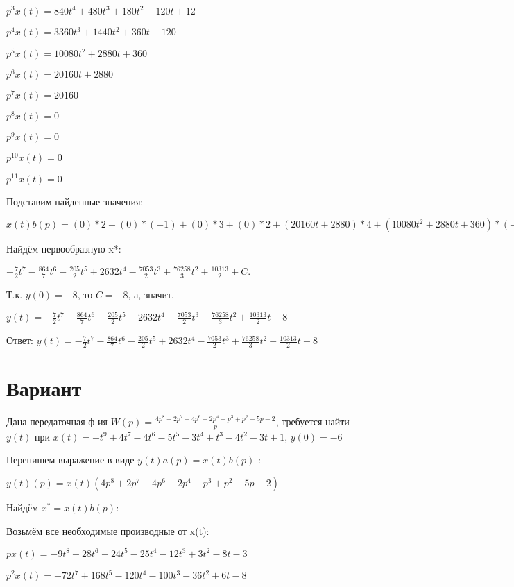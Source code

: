 \documentclass{article}
\begin{document}
{{{$p^3x(t)=840t^{4}+480t^{3}+180t^{2}-120t+12$

$p^4x(t)=3360t^{3}+1440t^{2}+360t-120$

$p^5x(t)=10080t^{2}+2880t+360$

$p^6x(t)=20160t+2880$

$p^7x(t)=20160$

$p^8x(t)=0$

$p^9x(t)=0$

$p^10x(t)=0$

$p^11x(t)=0$

Подставим найденные значения:

$x(t)b(p) = (0)*2+(0)*(-1)+(0)*3+(0)*2+(20160t+2880)*4+(10080t^{2}+2880t+360)*(-2)+(3360t^{3}+1440t^{2}+360t-120)*4+(168t^{5}+120t^{4}+60t^{3}-60t^{2}+12t+2)*(-5)+(28t^{6}+24t^{5}+15t^{4}-20t^{3}+6t^{2}+2t-3)*(-1)+=-28t^{6}-864t^{5}-615t^{4}+13160t^{3}-14106t^{2}+76258t$





Найдём первообразную x*:

$-\frac{7}{2}t^{7}-\frac{864}{7}t^{6}-\frac{205}{2}t^{5}+2632t^{4}-\frac{7053}{2}t^{3}+\frac{76258}{3}t^{2}+\frac{10313}{2}+C.$

Т.к. $y(0)=-8$, то $C=-8$, а, значит, 

$y(t)=-\frac{7}{2}t^{7}-\frac{864}{7}t^{6}-\frac{205}{2}t^{5}+2632t^{4}-\frac{7053}{2}t^{3}+\frac{76258}{3}t^{2}+\frac{10313}{2}t-8$

Ответ: $y(t) = -\frac{7}{2}t^{7}-\frac{864}{7}t^{6}-\frac{205}{2}t^{5}+2632t^{4}-\frac{7053}{2}t^{3}+\frac{76258}{3}t^{2}+\frac{10313}{2}t-8$

\section{Вариант}

Дана передаточная ф-ия $W(p)=\frac{4p^{8}+2p^{7}-4p^{6}-2p^{4}-p^{3}+p^{2}-5p-2}{p}$, требуется найти $y(t)$ при $x(t)=-t^{9}+4t^{7}-4t^{6}-5t^{5}-3t^{4}+t^{3}-4t^{2}-3t+1$, $y(0)=-6$

Перепишем выражение в виде $y(t)a(p)=x(t)b(p)$ :

$y(t)(p)=x(t)(4p^{8}+2p^{7}-4p^{6}-2p^{4}-p^{3}+p^{2}-5p-2)$

Найдём $x^*=x(t)b(p)$:

Возьмём все необходимые производные от x(t):

$px(t)=-9t^{8}+28t^{6}-24t^{5}-25t^{4}-12t^{3}+3t^{2}-8t-3$

$p^2x(t)=-72t^{7}+168t^{5}-120t^{4}-100t^{3}-36t^{2}+6t-8$

}}}
\end{document}
